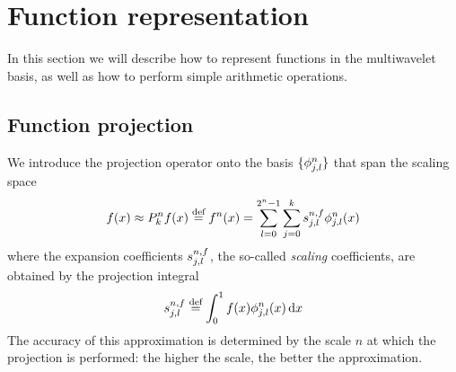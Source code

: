 \section{Function representation}
In this section we will describe how to represent functions in the multiwavelet
basis, as well as how to perform simple arithmetic operations.

\subsection{Function projection}
We introduce the projection operator  onto the basis 
$\lbrace\phi^n_{j,l}\rbrace$ that span the scaling space 
\begin{equation}
    \label{eq:scaling_exp}
    f(x) \approx {P}_{k}^{n}f(x) \stackrel{\text{def}}{\hbox{=}} {f}^{n}(x) =
	\sum_{l=0}^{2^n-1}\sum_{j=0}^ks^{n,f}_{j,l}\phi^n_{j,l}(x)
\end{equation}
where the expansion coefficients $s^{n,f}_{j,l}$, the so-called \emph{scaling}
coefficients, are obtained by the projection integral
\begin{equation}
    \label{eq:scaling_coef}
    s^{n,f}_{j,l} \stackrel{\text{def}}{\hbox{=}} \int_0^1f(x)\phi^n_{j,l}(x)\,\mathrm{d} x
\end{equation}
The accuracy of this approximation is determined by the scale $n$ at which the
projection is performed: the higher the scale, the better the approximation.

